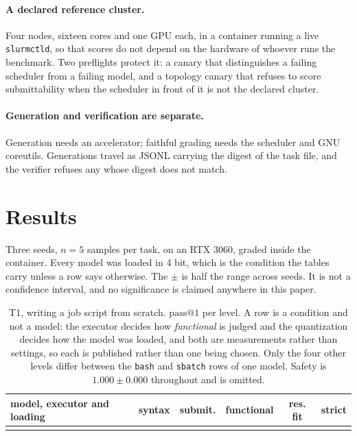 \documentclass[11pt,a4paper]{article}
\begin{document}
\paragraph{A declared reference cluster.} Four nodes, sixteen cores and one GPU each, in a
container running a live \texttt{slurmctld}, so that scores do not depend on the hardware of
whoever runs the benchmark. Two preflights protect it: a canary that distinguishes a failing
scheduler from a failing model, and a topology canary that refuses to score submittability when the
scheduler in front of it is not the declared cluster.

\paragraph{Generation and verification are separate.} Generation needs an accelerator; faithful
grading needs the scheduler and GNU coreutils. Generations travel as JSONL carrying the digest of
the task file, and the verifier refuses any whose digest does not match.

\section{Results}

Three seeds, $n=5$ samples per task, on an RTX 3060, graded inside the container. Every model was
loaded in 4 bit, which is the condition the tables carry unless a row says otherwise. The $\pm$ is
half the range across seeds. It is not a confidence interval, and no significance is claimed
anywhere in this paper.

\begin{table}[t]
\centering
\footnotesize
\setlength{\tabcolsep}{3pt}
\caption{T1, writing a job script from scratch. $\mathrm{pass}@1$ per level. A row is a
condition and not a model: the executor decides how \emph{functional} is judged and the
quantization decides how the model was loaded, and both are measurements rather than settings, so
each is published rather than one being chosen. Only the four other levels differ between the
\texttt{bash} and \texttt{sbatch} rows of one model. Safety is $1.000 \pm 0.000$ throughout and is
omitted.}
\label{tab:t1}
\begin{tabular}{lccccc}
\toprule
model, executor and loading & syntax & submit. & functional & res. fit & strict \\
\midrule
 \\
\bottomrule
\end{tabular}
\end{table}
\end{document}
